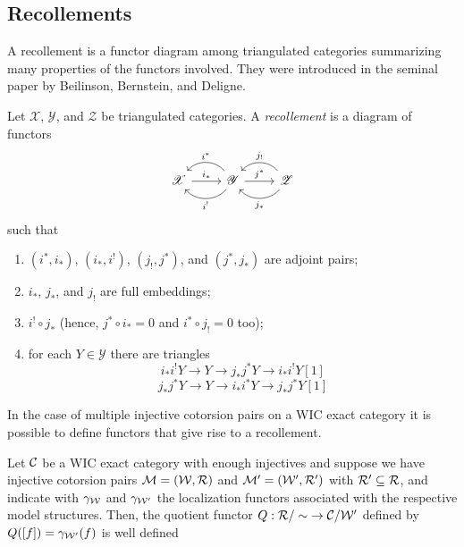 \subsection{Recollements}

A recollement is a functor diagram among triangulated categories summarizing many properties of the functors involved. They were introduced in the seminal paper \cite{bbd82} by Beilinson, Bernstein, and Deligne.

\begin{defn}\label{def:recoll}
  Let $\mathscr{X}$, $\mathscr{Y}$, and $\mathscr{Z}$ be triangulated categories. A \emph{recollement} is a diagram of functors
  \begin{equation*}
    \begin{tikzcd}
      \mathscr{X}\arrow{r}{i_\ast}
      & \mathscr{Y}\arrow[bend left=50]{l}{i^!}\arrow[bend right=50]{l}[']{i^\ast}\arrow{r}{j^\ast}
      & \mathscr{Z}\arrow[bend left=50]{l}{j_\ast}\arrow[bend right=50]{l}[']{j_!}
    \end{tikzcd}
  \end{equation*}
  such that
  \begin{enumerate}[label=(\arabic*)]
    \item $(i^\ast,i_\ast)$, $(i_\ast,i^!)$, $(j_!,j^\ast)$, and $(j^\ast,j_\ast)$ are adjoint pairs;
    \item $i_\ast$, $j_\ast$, and $j_!$ are full embeddings;
    \item $i^!\circ j_\ast$ (hence, $j^\ast\circ i_\ast=0$ and $i^\ast\circ j_!=0$ too);
    \item for each $Y\in\mathscr{Y}$ there are triangles
      \[
        i_\ast i^! Y\to Y\to j_\ast j^\ast Y\to i_\ast i^! Y[1]
      \]
      \[
        j_\ast j^\ast Y\to Y\to i_\ast i^\ast Y\to j_\ast j^\ast Y[1]
      \]
  \end{enumerate}
\end{defn}

In the case of multiple injective cotorsion pairs on a WIC exact category it is possible to define functors that give rise to a recollement.

\begin{lem}{\cite[Lemma~3.3]{G7}}\label{lemma:gill_quotient_functor}
  Let $\mathcal{C}$ be a WIC exact category with enough injectives and suppose we have injective cotorsion pairs $\mathcal{M}=(\mathcal{W},\mathcal{R})$ and $\mathcal{M}'=(\mathcal{W}',\mathcal{R}')$ with $\mathcal{R}'\subseteq \mathcal{R}$, and indicate with $\gamma_{\mathcal{W}}$ and $\gamma_{\mathcal{W}'}$ the localization functors associated with the respective model structures. Then, the quotient functor $Q:{\mathcal{R}/\sim}\to \mathcal{C}/\mathcal{W}'$ defined by $Q([f])=\gamma_{\mathcal{W}'}(f)$ is well defined
\end{lem}

